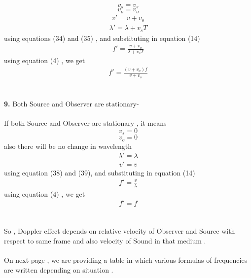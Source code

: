 \documentclass[journal,12pt,twocolumn]{IEEEtran}
\theoremstyle{remark}
\begin{document}
$$v_s = v_s$$
$$v_o = v_o$$
\begin{align}v'= v+v_o\end{align}
\begin{align}\lambda' = \lambda + v_s T\end{align}
using equations (34) and (35) , and substituting in equation (14) 
\begin{align}f' = \frac{v+v_o}{\lambda+v_s T}\end{align}
using equation (4) , we get 
\begin{align}f' = \frac{(v+v_o) f}{v +v_s}\end{align}\\\\
\textbf{9.} Both Source and Observer are stationary-\\\\
If both Source and Observer are stationary , it means 
$$v_s = 0$$
$$v_o = 0$$
also there will be no change in wavelength 
\begin{align}\lambda' = \lambda\end{align}
\begin{align}v'= v\end{align}
using equation (38) and (39), and substituting in equation (14) 
\begin{align}f' = \frac{v}{\lambda}\end{align}
using equation (4) , we get 
\begin{align}f' = f\end{align}\\\\

So , Doppler effect depends on relative velocity of Observer and Source with respect to same frame and also velocity of Sound in that medium .\\\\
On next page , we are providing a table in which various formulas of frequencies are written depending on situation .
\newpage
    \begin{table}[h]
        
    \end{table}
\end{document}
